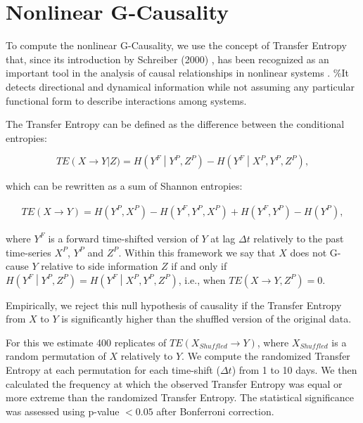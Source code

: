 \documentclass[]{book}
\theoremstyle{definition}
\theoremstyle{definition}
\theoremstyle{definition}
\theoremstyle{remark}
\begin{document}
\section{Nonlinear G-Causality}\label{nonlinear-g-causality}

To compute the nonlinear G-Causality, we use the concept of Transfer
Entropy that, since its introduction by Schreiber (2000)
\cite{PhysRevLett.85.461}, has been recognized as an important tool in
the analysis of causal relationships in nonlinear systems
\cite{citeulike:1447442}. \%It detects directional and dynamical
information \cite{10.1371/journal.pone.0109462} while not assuming any
particular functional form to describe interactions among systems.

The Transfer Entropy can be defined as the difference between the
conditional entropies:

\begin{equation}
 TE\left(X \rightarrow Y\right \vert Z) =  H\left(Y^F\middle\vert Y^P,Z^P\right) - H\left(Y^F\middle\vert X^P, Y^P,Z^P\right),
\label{eq:TE}
\end{equation}

which can be rewritten as a sum of Shannon entropies:

\begin{align}
TE\left(X \rightarrow Y\right) = H\left(Y^P, X^P\right) - H\left(Y^F, Y^P, X^P\right) + H\left(Y^F, Y^P\right) - H\left(Y^P\right),
\end{align}

where \(Y^F\) is a forward time-shifted version of \(Y\) at lag
\(\Delta t\) relatively to the past time-series \(X^P\), \(Y^P\) and
\(Z^P\). Within this framework we say that \(X\) does not G-cause \(Y\)
relative to side information \(Z\) if and only if
\(H\left(Y^F\middle\vert Y^P,Z^P \right) = H\left(Y^F\middle\vert X^P, Y^P,Z^P\right)\),
i.e., when \(TE\left(X \rightarrow Y,Z^P\right) = 0\).

Empirically, we reject this null hypothesis of causality if the Transfer
Entropy from \(X\) to \(Y\) is significantly higher than the shuffled
version of the original data.

For this we estimate 400 replicates of
\(TE(X_{Shuffled} \rightarrow Y)\), where \(X_{Shuffled}\) is a random
permutation of \(X\) relatively to \(Y\). We compute the randomized
Transfer Entropy at each permutation for each time-shift (\(\Delta t\))
from 1 to 10 days. We then calculated the frequency at which the
observed Transfer Entropy was equal or more extreme than the randomized
Transfer Entropy. The statistical significance was assessed using
p-value \(< 0.05\) after Bonferroni correction.
\end{document}
